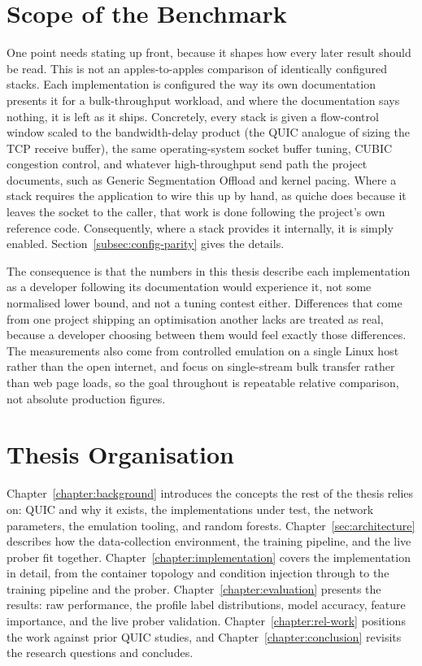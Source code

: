 \section{Scope of the Benchmark}
\label{sec:intro-scope}

One point needs stating up front, because it shapes how every later result
should be read. This is not an apples-to-apples comparison of identically
configured stacks. Each implementation is configured the way its own
documentation presents it for a bulk-throughput workload, and where the
documentation says nothing, it is left as it ships. Concretely, every stack is
given a flow-control window scaled to the bandwidth-delay product (the QUIC
analogue of sizing the TCP receive buffer), the same operating-system socket
buffer tuning, CUBIC congestion control, and whatever high-throughput send path
the project documents, such as Generic Segmentation Offload and kernel pacing.
Where a stack requires the application to wire this up by hand, as quiche does
because it leaves the socket to the caller, that work is done following the
project's own reference code. Consequently, where a stack provides it internally, it is simply
enabled. Section~\ref{subsec:config-parity} gives the details.

The consequence is that the numbers in this thesis describe each implementation
as a developer following its documentation would experience it, not some
normalised lower bound, and not a tuning contest either. Differences that come
from one project shipping an optimisation another lacks are treated as real,
because a developer choosing between them would feel exactly those differences.
The measurements also come from controlled emulation on a single Linux host
rather than the open internet, and focus on single-stream bulk transfer rather
than web page loads, so the goal throughout is repeatable relative comparison,
not absolute production figures.

\section{Thesis Organisation}
\label{sec:intro-organisation}

Chapter~\ref{chapter:background} introduces the concepts the rest of the thesis
relies on: QUIC and why it exists, the implementations under test, the network
parameters, the emulation tooling, and random forests.
Chapter~\ref{sec:architecture} describes how the data-collection environment,
the training pipeline, and the live prober fit together.
Chapter~\ref{chapter:implementation} covers the implementation in detail, from
the container topology and condition injection through to the training pipeline
and the prober. Chapter~\ref{chapter:evaluation} presents the results: raw
performance, the profile label distributions, model accuracy, feature
importance, and the live prober validation. Chapter~\ref{chapter:rel-work}
positions the work against prior QUIC studies, and
Chapter~\ref{chapter:conclusion} revisits the research questions and concludes.
